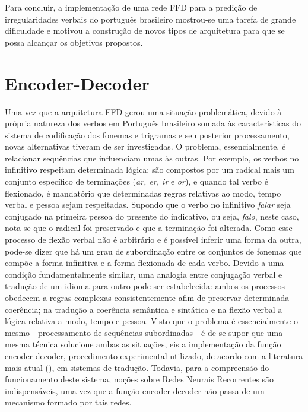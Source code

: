 Para concluir, a implementação de uma rede FFD para a predição de irregularidades verbais do português brasileiro mostrou-se uma tarefa de grande dificuldade e motivou a construção de novos tipos de arquitetura para que se possa alcançar os objetivos propostos. 

\section{Encoder-Decoder}
\label{sec:enc-dec}

Uma vez que a arquitetura FFD gerou uma situação problemática, devido à própria natureza dos verbos em Português brasileiro somada às características do sistema de codificação dos fonemas e trigramas e seu posterior processamento, novas alternativas tiveram de ser investigadas. O problema, essencialmente, é relacionar sequências que influenciam umas às outras. Por exemplo, os verbos no infinitivo respeitam determinada lógica: são compostos por um radical mais um conjunto específico de terminações (\textit{ar, er, ir} e \textit{or}), e quando tal verbo é flexionado, é mandatório que determinadas regras relativas ao modo, tempo verbal e pessoa sejam respeitadas. Supondo que o verbo no infinitivo \textit{falar} seja conjugado na primeira pessoa do presente do indicativo, ou seja, \textit{falo}, neste caso, nota-se que o radical foi preservado e que a terminação foi alterada. Como esse processo de flexão verbal não é arbitrário e é possível inferir uma forma da outra, pode-se dizer que há um grau de subordinação entre os conjuntos de fonemas que compõe a forma infinitiva e a forma flexionada de cada verbo. Devido a uma condição fundamentalmente similar, uma analogia entre conjugação verbal e tradução de um idioma para outro pode ser estabelecida: ambos os processos obedecem a regras complexas consistentemente afim de preservar determinada coerência; na tradução a coerência semântica e sintática e na flexão verbal a lógica relativa a modo, tempo e pessoa. Visto que o problema é essencialmente o mesmo - processamento de sequências subordinadas - é de se supor que uma mesma técnica solucione ambas as situações, eis a implementação da função encoder-decoder, procedimento experimental utilizado, de acordo com a literatura mais atual (\cite{Goodfellow-et-al-2016}), em sistemas de tradução. Todavia, para a compreensão do funcionamento deste sistema, noções sobre Redes Neurais Recorrentes são indispensáveis, uma vez que a função encoder-decoder não passa de um mecanismo formado por tais redes.

